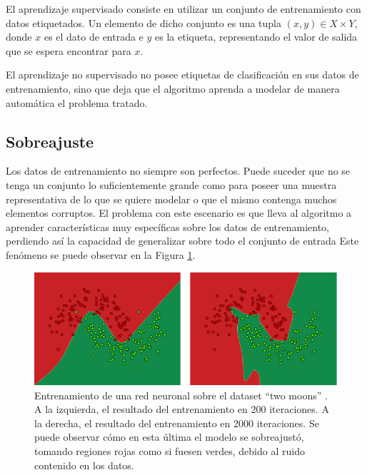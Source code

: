 \documentclass[spanish]{report}
\begin{document}
El aprendizaje supervisado consiste en utilizar un conjunto de entrenamiento con datos etiquetados. Un elemento de dicho conjunto es una tupla $(x, y) \in X \times Y$, donde $x$ es el dato de entrada e $y$ es la etiqueta, representando el valor de salida que se espera encontrar para $x$.

El aprendizaje no supervisado no posee etiquetas de clasificación en sus datos de entrenamiento, sino que deja que el algoritmo aprenda a modelar de manera automática el problema tratado.


\subsection{Sobreajuste}\label{sobreajuste}

Los datos de entrenamiento no siempre son perfectos. Puede suceder que no se tenga un conjunto lo suficientemente grande como para poseer una muestra representativa de lo que se quiere modelar o que el mismo contenga muchos elementos corruptos. El problema con este escenario es que lleva al algoritmo a aprender características muy específicas sobre los datos de entrenamiento, perdiendo así la capacidad de generalizar sobre todo el conjunto de entrada Este fenómeno se puede observar en la Figura \ref{fig:graphsobreajuste}.


\begin{figure}[h!]
  \includegraphics[width=\linewidth]{overfit_ejemplos.png}
  \caption{Entrenamiento de una red neuronal sobre el dataset ``two moons'' \cite{scikitLearn}. A la izquierda, el resultado del entrenamiento en 200 iteraciones. A la derecha, el resultado del entrenamiento en 2000 iteraciones. Se puede observar cómo en esta última el modelo se sobreajustó, tomando regiones rojas como si fuesen verdes, debido al ruido contenido en los datos.}
  \label{fig:graphsobreajuste}
\end{figure}
\end{document}
